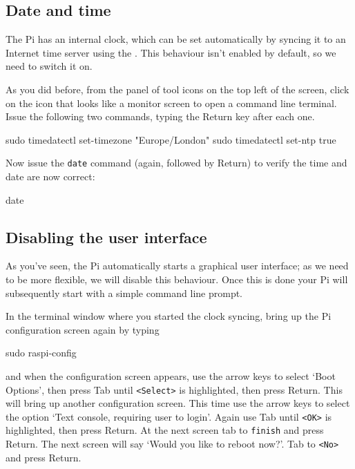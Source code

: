 \subsection{Date and time}

The Pi has an internal clock, which can be set automatically by
syncing it to an Internet time server using the
. This
behaviour isn't enabled by default, so we need to switch it on.

As you did before, from the panel of tool icons on the top left of the
screen, click on the icon that looks like a monitor screen to open a
command line terminal. Issue the following two commands, typing the
Return key after each one.

\begin{ttoutenv}
sudo timedatectl set-timezone "Europe/London"
sudo timedatectl set-ntp true
\end{ttoutenv}

Now issue the \verb+date+ command (again, followed by Return) to
verify the time and date are now correct:
 
\begin{ttoutenv}
date
\end{ttoutenv}

\subsection{Disabling the user interface}

As you've seen, the Pi automatically starts a graphical user
interface; as we need to be more flexible, we will disable this
behaviour. Once this is done your Pi will subsequently start with a
simple command line prompt.

In the terminal window where you started the clock syncing, bring up
the Pi configuration screen again by typing

\begin{ttoutenv}
sudo raspi-config
\end{ttoutenv}

and when the configuration screen appears, use the arrow keys to
select `Boot Options', then press Tab until \verb+<Select>+ is
highlighted, then press Return. This will bring up another
configuration screen. This time use the arrow keys to select the
option `Text console, requiring user to login'. Again use Tab until
\verb+<OK>+ is highlighted, then press Return. At the next screen tab
to \verb+finish+ and press Return. The next screen will say `Would you
like to reboot now?'. Tab to \verb+<No>+ and press Return.

